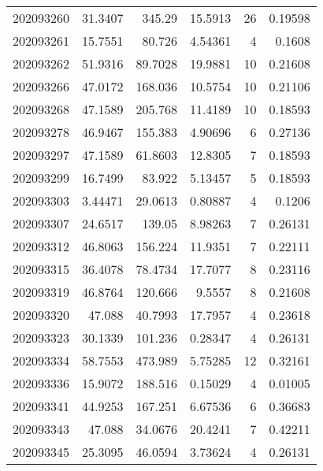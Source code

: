 \begin{tabular}{rrrrrr}
 202093260 &         31.3407  &      345.29   &           15.5913  &          26 & 0.19598 \\
 202093261 &         15.7551  &       80.726  &            4.54361 &           4 & 0.1608  \\
 202093262 &         51.9316  &       89.7028 &           19.9881  &          10 & 0.21608 \\
 202093266 &         47.0172  &      168.036  &           10.5754  &          10 & 0.21106 \\
 202093268 &         47.1589  &      205.768  &           11.4189  &          10 & 0.18593 \\
 202093278 &         46.9467  &      155.383  &            4.90696 &           6 & 0.27136 \\
 202093297 &         47.1589  &       61.8603 &           12.8305  &           7 & 0.18593 \\
 202093299 &         16.7499  &       83.922  &            5.13457 &           5 & 0.18593 \\
 202093303 &          3.44471 &       29.0613 &            0.80887 &           4 & 0.1206  \\
 202093307 &         24.6517  &      139.05   &            8.98263 &           7 & 0.26131 \\
 202093312 &         46.8063  &      156.224  &           11.9351  &           7 & 0.22111 \\
 202093315 &         36.4078  &       78.4734 &           17.7077  &           8 & 0.23116 \\
 202093319 &         46.8764  &      120.666  &            9.5557  &           8 & 0.21608 \\
 202093320 &         47.088   &       40.7993 &           17.7957  &           4 & 0.23618 \\
 202093323 &         30.1339  &      101.236  &            0.28347 &           4 & 0.26131 \\
 202093334 &         58.7553  &      473.989  &            5.75285 &          12 & 0.32161 \\
 202093336 &         15.9072  &      188.516  &            0.15029 &           4 & 0.01005 \\
 202093341 &         44.9253  &      167.251  &            6.67536 &           6 & 0.36683 \\
 202093343 &         47.088   &       34.0676 &           20.4241  &           7 & 0.42211 \\
 202093345 &         25.3095  &       46.0594 &            3.73624 &           4 & 0.26131 \\

\end{tabular}
